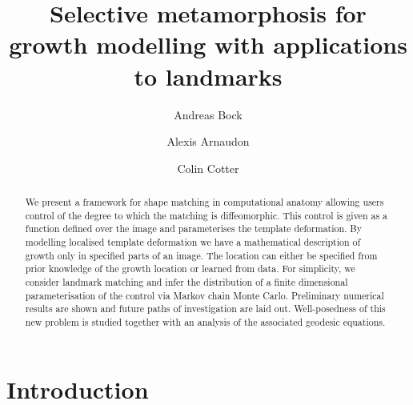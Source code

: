 \documentclass[runningheads]{llncs}
\begin{document}
%
\title{Selective metamorphosis for growth modelling with applications to landmarks}
%

\author{Andreas Bock \and  Alexis Arnaudon \and Colin Cotter}

%
%
\maketitle              %

\begin{abstract}
We present a framework for shape matching in computational anatomy allowing
users control of the degree to which the matching is diffeomorphic. This control
is given as a function defined over the image and parameterises the template
deformation. By modelling localised template deformation we have a mathematical
description of growth only in specified parts of an image. The location can
either be specified from prior knowledge of the growth location or learned from
data. For simplicity, we consider landmark matching and infer the distribution of
a finite dimensional parameterisation of the control via Markov chain Monte
Carlo.  Preliminary numerical results are shown and future paths of
investigation are laid out. Well-posedness of this new problem is studied
together with an analysis of the associated geodesic equations. 
\end{abstract}

\section{Introduction}
\end{document}
